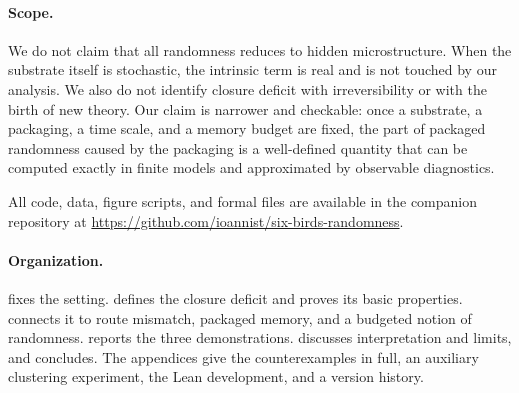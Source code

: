 \paragraph{Scope.} We do not claim that all randomness reduces to hidden microstructure. When the substrate itself is stochastic, the intrinsic term is real and is not touched by our analysis. We also do not identify closure deficit with irreversibility or with the birth of new theory. Our claim is narrower and checkable: once a substrate, a packaging, a time scale, and a memory budget are fixed, the part of packaged randomness caused by the packaging is a well-defined quantity that can be computed exactly in finite models and approximated by observable diagnostics.

All code, data, figure scripts, and formal files are available in the companion repository at \url{https://github.com/ioannist/six-birds-randomness}.

\paragraph{Organization.}  fixes the setting.  defines the closure deficit and proves its basic properties.  connects it to route mismatch, packaged memory, and a budgeted notion of randomness.  reports the three demonstrations.  discusses interpretation and limits, and  concludes. The appendices give the counterexamples in full, an auxiliary clustering experiment, the Lean development, and a version history.
